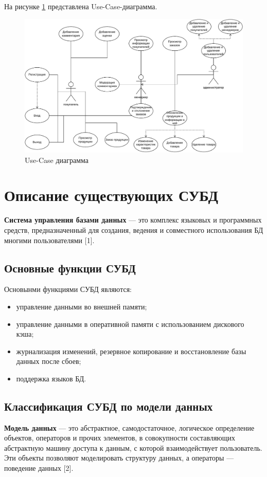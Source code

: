 На рисунке \ref{use_case} представлена Use-Case-диаграмма.

\captionsetup{singlelinecheck = false, justification=centering}
\begin{figure}[h!]
	\begin{center}
		\includegraphics[scale=0.6]{assets/use_case.pdf}
	\end{center}
	\caption{Use-Case диаграмма}
	\label{use_case}
\end{figure}

\section{Описание существующих СУБД}
\textbf{Система управления базами данных} --- это комплекс языковых и программных средств, предназначенный для создания, ведения и совместного использования БД многими пользователями [1]. 

\subsection{Основные функции СУБД}
Основынми функциями СУБД являются:
\begin{itemize}
	\item управление данными во внешней памяти;
	\item управление данными в оперативной памяти с использованием дискового кэша;
	\item журнализация изменений, резервное копирование и восстановление базы данных после сбоев;
	\item поддержка языков БД.
\end{itemize}

\subsection{Классификация СУБД по модели данных}
\textbf{Модель данных} --- это абстрактное, самодостаточное, логическое определение объектов, операторов и прочих элементов, в совокупности составляющих абстрактную машину доступа к данным, с которой взаимодействует пользователь. Эти объекты позволяют моделировать структуру данных, а операторы --- поведение данных [2]. 

